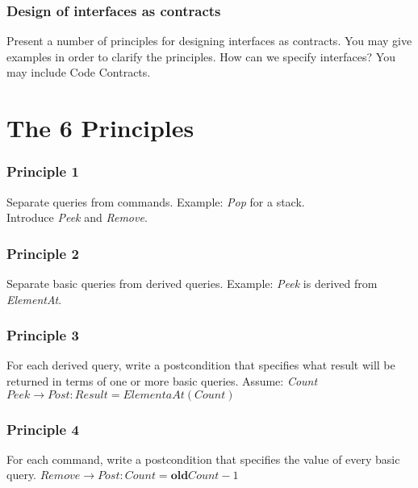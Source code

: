 

\begin{frame}
    \frametitle{Design of interfaces as contracts}

    Present a number of principles for designing interfaces as contracts. You
    may give examples in order to clarify the principles. How can we specify
    interfaces? You may include Code Contracts.
\end{frame}

\section{The 6 Principles}

\begin{frame}
    \frametitle{Principle 1}
    \begin{block}{Separate queries from commands.}
        Example: \emph{Pop} for a stack.\\
        \pause Introduce \emph{Peek} and \emph{Remove}.
    \end{block}
\end{frame}

\begin{frame}
    \frametitle{Principle 2}
    \begin{block}{Separate basic queries from derived queries.}
        Example: \emph{Peek} is derived from \emph{ElementAt}.
    \end{block}
\end{frame}

\begin{frame}
    \frametitle{Principle 3}
    \begin{block}{For each derived query, write a postcondition that specifies
        what result will be returned in terms of one or more basic queries.}
        Assume: \emph{Count}\\
        \pause $Peek \to Post: Result = ElementaAt(Count)$
    \end{block}
\end{frame}

\begin{frame}
    \frametitle{Principle 4}
    \begin{block}{For each command, write a postcondition that specifies the
        value of every basic query.}
        $Remove \to Post: Count = \textbf{old} Count - 1$
    \end{block}
\end{frame}


